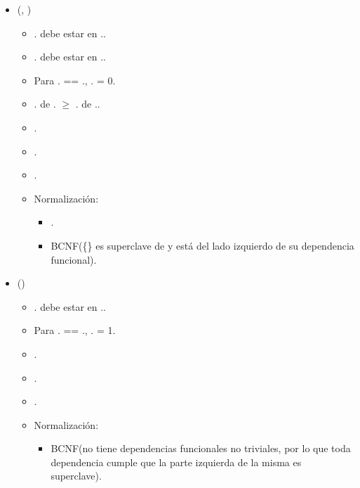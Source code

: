 \begin{itemize}
        \item {}(, 
            )
            \begin{itemize}
                \item {}. debe estar en 
                    ..
                \item {}. debe estar en
                    ..
                \item Para . == 
                    ., 
                    . = 0.
                \item {}. de 
                    . $\geq$ 
                    . de 
                    ..
                \item {}.
                \item {}.
                \item {}.
                \item Normalización:
                    \begin{itemize}
                        \item {}.
                        \item BCNF(\{\} es superclave de 
                             y está del lado izquierdo 
                            de su dependencia funcional).
                    \end{itemize}
            \end{itemize}

        \item {}()
            \begin{itemize}
                \item {}. debe estar en 
                    ..
                \item Para . == 
                    .,
                    . = 1.
                \item {}.
                \item {}.
                \item \FK{$\emptyset$}.
                \item Normalización:
                    \begin{itemize}
                        \item BCNF(no tiene dependencias funcionales no 
                            triviales, por lo que toda dependencia cumple que
                            la parte izquierda de la misma es superclave).
                    \end{itemize}
            \end{itemize}


\end{itemize}
